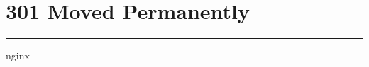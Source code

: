 \hypertarget{301-moved-permanently}{%
\section{301 Moved Permanently}\label{301-moved-permanently}}

\begin{center}\rule{0.5\linewidth}{\linethickness}\end{center}

nginx
